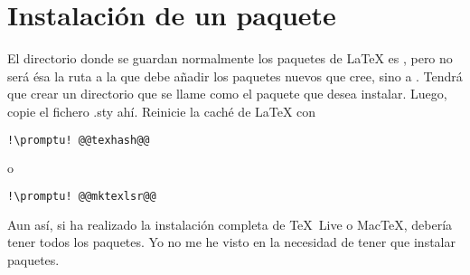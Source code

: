 \section{Instalación de un paquete}\label{sec:tex-install-p}
El directorio donde se guardan normalmente los paquetes de \LaTeX{} es
, pero no será ésa la ruta a la que debe añadir los
paquetes nuevos que cree, sino a . Tendrá que crear un directorio que se llame
como el paquete que desea instalar. Luego, copie el fichero .sty ahí. Reinicie la caché de \LaTeX{}
con

\begin{lstlisting}[gobble=2,language=bash,style=bashinteract,escapechar=!]
  !\promptu! @@texhash@@
\end{lstlisting}

\noindent o

\begin{lstlisting}[gobble=2,language=bash,style=bashinteract,escapechar=!]
  !\promptu! @@mktexlsr@@
\end{lstlisting}

Aun así, si ha realizado la instalación completa de \TeX\ Live o MacTeX, debería tener todos los paquetes. Yo no
me he visto en la necesidad de tener que instalar paquetes.

